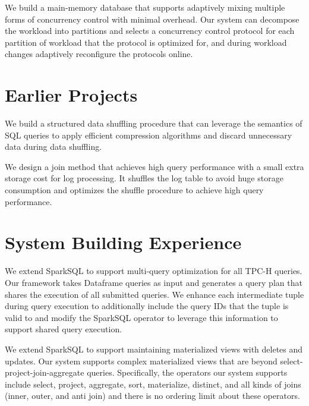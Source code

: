 \documentclass[10pt]{article} %
\begin{document}
{
We build a main-memory database that supports adaptively mixing multiple forms of concurrency control with minimal overhead. 
Our system can decompose the workload into partitions and 
selects a concurrency control protocol for each partition of workload that the protocol is optimized for, 
and during workload changes adaptively reconfigure the protocols online.
}

\section{Earlier Projects}
{
We build a structured data shuffling procedure that can leverage the semantics of SQL queries to apply efficient compression algorithms 
and discard unnecessary data during data shuffling. 
}

{
We design a join method that achieves high query performance with a small extra storage cost for log processing. 
It shuffles the log table to avoid huge storage consumption and optimizes the shuffle procedure to achieve high query performance.
}

\vspace{-5mm}


\section{System Building Experience}

{We extend SparkSQL to support multi-query optimization for all TPC-H queries. 
Our framework takes Dataframe queries as input and generates a query plan 
that shares the execution of all submitted queries. 
We enhance each intermediate tuple during query execution to 
additionally include the query IDs that the tuple is valid to 
and modify the SparkSQL operator to leverage this information 
to support shared query execution.}

{We extend SparkSQL to support maintaining materialized views with deletes and updates.
Our system supports complex materialized views that are beyond select-project-join-aggregate queries. 
Specifically, the operators our system supports include select, project, aggregate, sort, materialize, distinct, 
and all kinds of joins (inner, outer, and anti join) and there is no ordering limit about these operators.}
\end{document}

